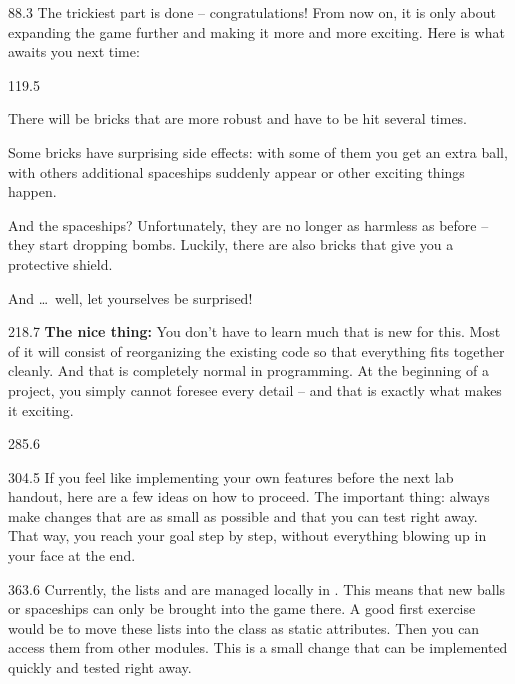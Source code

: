 \documentclass{aslab}
\begin{document}
\begin{region}[pitch=13.1]{88.3}
The trickiest part is done -- congratulations! From now on, it is only about
expanding the game further and making it more and more exciting. Here is
what awaits you next time:
\end{region}

\begin{region}[pitch=13.2]{119.5}
\begin{dashlist}
\item There will be bricks that are more robust and have to be hit several
  times.
\item Some bricks have surprising side effects: with some of them you get
  an extra ball, with others additional spaceships suddenly appear or other
  exciting things happen.
\item And the spaceships? Unfortunately, they are no longer as harmless as
  before -- they start dropping bombs. Luckily, there are also bricks that
  give you a protective shield.
\item And \dots\ well, let yourselves be surprised!
\end{dashlist}
\end{region}

\begin{region}[pitch=13.23]{218.7}
\textbf{The nice thing:} You don't have to learn much that is new for this.
Most of it will consist of reorganizing the existing code so that everything
fits together cleanly. And that is completely normal in programming. At the
beginning of a project, you simply cannot foresee every detail -- and that
is exactly what makes it exciting.
\end{region}

\begin{region}{285.6}
\end{region}

\begin{region}[pitch=13.17]{304.5}
If you feel like implementing your own features before the next lab
handout, here are a few ideas on how to proceed. The important thing: always
make changes that are as small as possible and that you can test right
away. That way, you reach your goal step by step, without everything
blowing up in your face at the end.
\end{region}

\begin{region}[pitch=13.3]{363.6}
Currently, the lists  and  are managed locally in
. This means that new balls or spaceships can only be
brought into the game there. A good first exercise would be to move these
lists into the class  as static attributes. Then you can access
them from other modules. This is a small change that can be implemented
quickly and tested right away.
\end{region}
\end{document}
